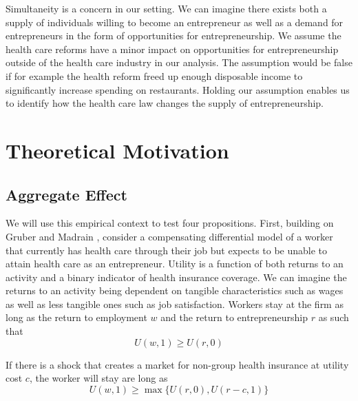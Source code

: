 \documentclass[12pt]{article}
\begin{document}
Simultaneity is a concern in our setting. We can imagine there exists both a supply of individuals willing to become an entrepreneur as well as a demand for entrepreneurs in the form of opportunities for entrepreneurship. We assume the health care reforms have a minor impact on opportunities for entrepreneurship outside of the health care industry in our analysis. The assumption would be false if for example the health reform freed up enough disposable income to significantly increase spending on restaurants. Holding our assumption enables us to identify how the health care law changes the supply of entrepreneurship. 

\begin{comment}

Another concern is whether the stable unit treatment value assumption (SUTVA) holds. It can fail if for example entrepreneurs moved from Rhode Island to Massachusetts to take advantage of the health reform. If this occurs, we expect our results to be biased upwards. We believe our use of synthetic controls based on counties across the US helps isolates us from violations since any mobility . 

\end{comment}

\section{Theoretical Motivation}
\label{sec:model}

\subsection{Aggregate Effect}

We will use this empirical context to test four propositions. First, building on Gruber and Madrain \cite{gm2002}, consider a compensating differential model of a worker that currently has health care through their job but expects to be unable to attain health care as an entrepreneur. Utility is a function of both returns to an activity and a binary indicator of health insurance coverage. We can imagine the returns to an activity being dependent on tangible characteristics such as wages as well as less tangible ones such as job satisfaction. Workers stay at the firm as long as the return to employment $w$ and the return to entrepreneurship $r$ as such that
$$U(w,1) \ge U(r,0)$$

If there is a shock that creates a market for non-group health insurance at utility cost $c$, the worker will stay are long as
$$U(w,1) \ge \max\{U(r,0),U(r-c,1)\}$$
\end{document}
